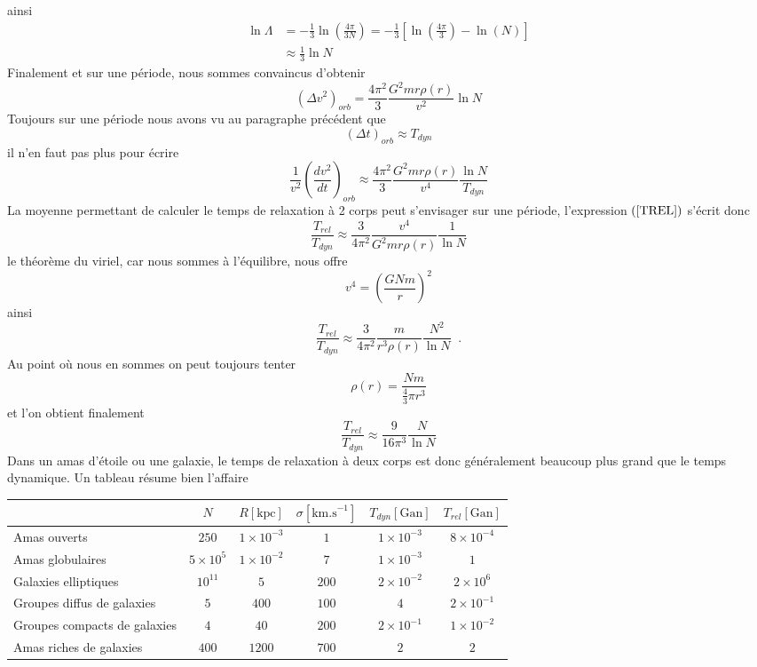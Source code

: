 ainsi%
\begin{align*}
\ln\Lambda &  =-\frac{1}{3}\ln\left(  \frac{4\pi}{3N}\right)  =-\frac{1}%
{3}\left[  \ln\left(  \frac{4\pi}{3}\right)  -\ln\left(  N\right)  \right] \\
&  \approx\frac{1}{3}\ln N
\end{align*}
Finalement et sur une p\'{e}riode, nous sommes convaincus d'obtenir%
\[
\left(  \Delta v^{2}\right)  _{orb}=\frac{4\pi^{2}}{3}\frac{G^{2}mr\rho\left(
r\right)  }{v^{2}}\ln N
\]
Toujours sur une p\'{e}riode nous avons vu au paragraphe pr\'{e}c\'{e}dent
que
\[
\left(  \Delta t\right)  _{orb}\approx T_{dyn}%
\]
il n'en faut pas plus pour \'{e}crire%
\[
\frac{1}{v^{2}}\left(  \frac{dv^{2}}{dt}\right)  _{orb}\approx\frac{4\pi^{2}%
}{3}\frac{G^{2}mr\rho\left(  r\right)  }{v^{4}}\frac{\ln N}{T_{dyn}}%
\]
La moyenne permettant de calculer le temps de relaxation \`{a} 2 corps peut
s'envisager sur une p\'{e}riode, l'expression $\left(  \ref{TREL}\right)  $
s'\'{e}crit donc%
\[
\frac{T_{rel}}{T_{dyn}}\approx\frac{3}{4\pi^{2}}\frac{v^{4}}{G^{2}%
mr\rho\left(  r\right)  }\frac{1}{\ln N}%
\]
le th\'{e}or\`{e}me du viriel, car nous sommes \`{a} l'\'{e}quilibre, nous
offre%
\[
v^{4}=\left(  \frac{GNm}{r}\right)  ^{2}%
\]
ainsi%
\[
\frac{T_{rel}}{T_{dyn}}\approx\frac{3}{4\pi^{2}}\frac{m}{r^{3}\rho\left(
r\right)  }\frac{N^{2}}{\ln N}\;\;.
\]
Au point o\`{u} nous en sommes on peut toujours tenter
\[
\rho\left(  r\right)  =\frac{Nm}{\frac{4}{3}\pi r^{3}}%
\]
et l'on obtient finalement%
\[
\frac{T_{rel}}{T_{dyn}}\approx\frac{9}{16\pi^{3}}\frac{N}{\ln N}%
\]
Dans un amas d'\'{e}toile ou une galaxie, le
temps de relaxation \`{a} deux corps est donc g\'{e}n\'{e}ralement beaucoup
plus grand que le temps dynamique. Un tableau r\'{e}sume bien l'affaire

\begin{center}
\bigskip%
\begin{tabular}
[c]{l|c|c|c|c|c|}\cline{2-6}
& $N$ & $R\left[  \text{kpc}\right]  $ & $\sigma\left[  \text{km.s}%
^{-1}\right]  $ & $T_{dyn}\left[  \text{Gan}\right]  $ & $T_{rel}\left[
\text{Gan}\right]  $\\\hline
{\small {Amas ouverts}} & $250$ & $1\times10^{-3}$ & $1$ & $1\times10^{-3}$ &
$8\times10^{-4}$\\\hline
{\small {Amas globulaires}} & $5\times10^{5}$ & $1\times10^{-2}$ & $7$ &
$1\times10^{-3}$ & $1$\\\hline
{\small {Galaxies elliptiques}} & $10^{11}$ & $5$ & $200$ & $2\times10^{-2}$ &
$2\times10^{6}$\\\hline
{\small {Groupes diffus de galaxies}} & $5$ & $400$ & $100$ & $4$ &
$2\times10^{-1}$\\\hline
{\small {Groupes compacts de galaxies}} & $4$ & $40$ & $200$ & $2\times
10^{-1}$ & $1\times10^{-2}$\\\hline
{\small {Amas riches de galaxies}} & $400$ & $1200$ & $700$ & $2$ &
$2$\\\hline
\end{tabular}

\end{center}

